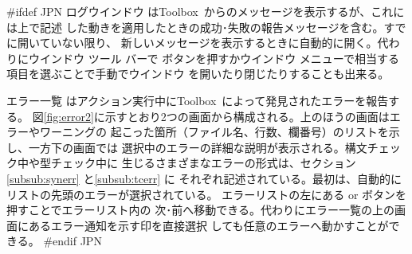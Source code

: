 \documentclass[\pformat,12pt]{article}
\newcommand{\Toolbox}{Toolbox}
\newcommand{\Toolbox}{Toolbox}
\newcommand{\guicmd}[1]{{\sf #1}}
\newcommand{\guicmd}[1]{{\gt #1}}
\begin{document}
#ifdef JPN
\guicmd{ログウインドウ} は\Toolbox\ からのメッセージを表示するが、これには上で記述
した動きを適用したときの成功･失敗の報告メッセージを含む。すでに開いていない限り、
新しいメッセージを表示するときに自動的に開く。代わりに\guicmd{ウインドウ} ツール
バーで 
ボタンを押すか\guicmd{ウインドウ} メニューで相当する項目を選ぶことで手動でウインドウ
を開いたり閉じたりすることも出来る。


\guicmd{エラー一覧} はアクション実行中に\Toolbox\ によって発見されたエラーを報告する。
図\ref{fig:error2}に示すとおり2つの画面から構成される。上のほうの画面はエラーやワーニングの
起こった箇所（ファイル名、行数、欄番号）のリストを示し、一方下の画面では
選択中のエラーの詳細な説明が表示される。構文チェック中や型チェック中に
生じるさまざまなエラーの形式は、セクション\ref{subsub:synerr} と\ref{subsub:tcerr} に
それぞれ記述されている。最初は、自動的にリストの先頭のエラーが選択されている。
エラーリストの左にある {\fbox{\tt >}} or \fbox{{\tt <}} ボタンを押すことでエラーリスト内の
次･前へ移動できる。代わりに\guicmd{エラー一覧}の上の画面にあるエラー通知を示す印を直接選択
しても任意のエラーへ動かすことができる。
#endif JPN
\end{document}
